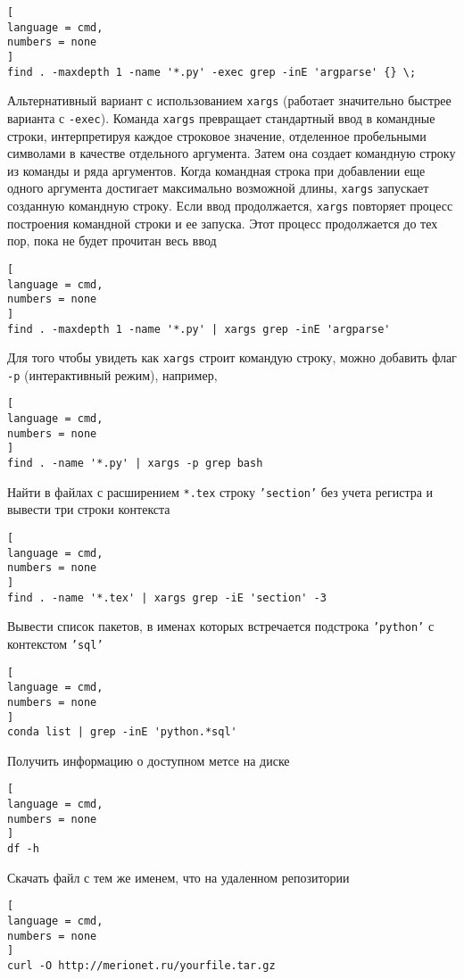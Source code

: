 \documentclass[%
	11pt,
	a4paper,
	utf8,
		]{article}
\begin{document}
\begin{lstlisting}[
language = cmd,
numbers = none
]
find . -maxdepth 1 -name '*.py' -exec grep -inE 'argparse' {} \;
\end{lstlisting}

Альтернативный вариант с использованием \texttt{xargs} (работает значительно быстрее варианта с \texttt{-exec}). Команда \texttt{xargs} превращает стандартный ввод в командные строки, интерпретируя каждое строковое значение, отделенное пробельными символами в качестве отдельного аргумента. Затем она создает командную строку из команды и ряда аргументов. Когда командная строка при добавлении еще одного аргумента достигает максимально возможной длины, \texttt{xargs} запускает созданную командную строку. Если ввод продолжается, \texttt{xargs} повторяет процесс построения командной строки и ее запуска. Этот процесс продолжается до тех пор, пока не будет прочитан весь ввод

\begin{lstlisting}[
language = cmd,
numbers = none
]
find . -maxdepth 1 -name '*.py' | xargs grep -inE 'argparse'
\end{lstlisting} 

Для того чтобы увидеть как \texttt{xargs} строит командую строку, можно добавить флаг \texttt{-p} (интерактивный режим), например,
\begin{lstlisting}[
language = cmd,
numbers = none
]
find . -name '*.py' | xargs -p grep bash
\end{lstlisting} 

Найти в файлах с расширением \texttt{*.tex} строку \texttt{'section'} без учета регистра и вывести три строки контекста
\begin{lstlisting}[
language = cmd,
numbers = none
]
find . -name '*.tex' | xargs grep -iE 'section' -3
\end{lstlisting}

Вывести список пакетов, в именах которых встречается подстрока \texttt{'python'} с контекстом \texttt{'sql'}
\begin{lstlisting}[
language = cmd,
numbers = none
]
conda list | grep -inE 'python.*sql'
\end{lstlisting}

Получить информацию о доступном метсе на диске
\begin{lstlisting}[
language = cmd,
numbers = none
]
df -h
\end{lstlisting}

Скачать файл с тем же именем, что на удаленном репозитории 
\begin{lstlisting}[
language = cmd,
numbers = none
]
curl -O http://merionet.ru/yourfile.tar.gz
\end{lstlisting}
\end{document}
